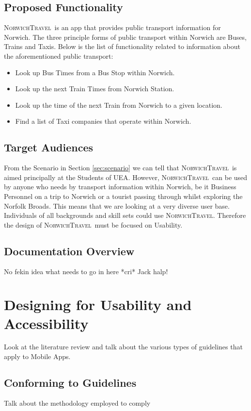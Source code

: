 \documentclass[cmpstyle]{ueacmpstyle}
\newcommand{\nt}{\textsc{NorwichTravel}}
\begin{document}
		\subsection{Proposed Functionality} \label{sec:prop-func}
		\nt \ is an app that provides public transport information for Norwich. The three principle forms of public transport within Norwich are Buses, Trains and Taxis. Below is the list of functionality related to information about the aforementioned public transport:
			\begin{itemize}
				\item Look up Bus Times from a Bus Stop within Norwich.
				\item Look up the next Train Times from Norwich Station.
				\item Look up the time of the next Train from Norwich to a given location.
				\item Find a list of Taxi companies that operate within Norwich. 
			\end{itemize} 
		
		\subsection{Target Audiences} \label{sec:target}
		From the Scenario in Section \ref{sec:scenario} we can tell that \nt \ is aimed principally at the Students of UEA. However, \nt \ can be used by anyone who needs by transport information within Norwich, be it Business Personnel on a trip to Norwich or a tourist passing through whilst exploring the Norfolk Broads. This means that we are looking at a very diverse user base. Individuals of all backgrounds and skill sets could use \nt. Therefore the design of \nt \ must be focused on Usability. 
		
		\subsection{Documentation Overview} \label{sec:doc-over}
		No fekin idea what needs to go in here *cri* Jack halp!
		
	\section{Designing for Usability and Accessibility} \label{sec:design}
	Look at the literature review and talk about the various types of guidelines that apply to Mobile Apps.
	
		\subsection{Conforming to Guidelines} \label{sec:conform}
		Talk about the methodology employed to comply
		
\end{document}
